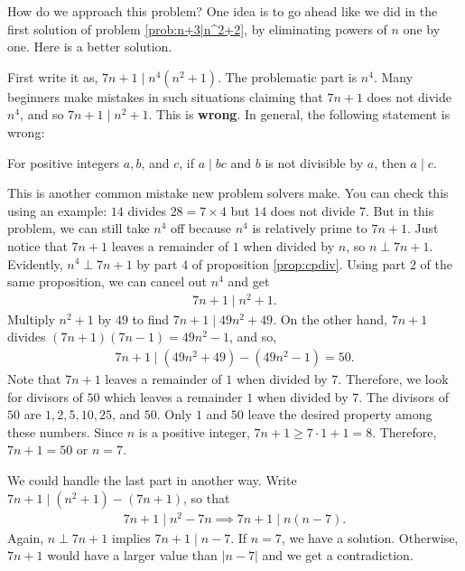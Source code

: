 \documentclass{subfile}
\begin{document}
		\begin{solution}
			How do we approach this problem? One idea is to go ahead like we did in the first solution of problem \eqref{prob:n+3|n^2+2}, by eliminating powers of $n$ one by one. Here is a better solution.

			First write it as, $7n+1 \mid n^4(n^2+1)$. The problematic part is $n^4$. Many beginners make mistakes in such situations claiming that $7n+1$ does not divide $n^4$, and so $7n+1 \mid n^2+1$. This is \textbf{wrong}. In general, the following statement is wrong:
			\begin{displayquote}
				For positive integers $a,b$, and $c$, if $a\mid bc$ and $b$ is not divisible by $a$, then $a\mid c$.
			\end{displayquote}
			This is another common  mistake new problem solvers make. You can check this using an example: $14$ divides $28=7\times4$ but $14$ does not divide $7$. But in this problem, we can still take $n^4$ off because $n^4$ is relatively prime to $7n+1$. Just notice that $7n+1$ leaves a remainder of $1$ when divided by $n$, so $n\perp7n+1$. Evidently, $n^4\perp7n+1$ by part $4$ of proposition \eqref{prop:cpdiv}. Using part $2$ of the same proposition, we can cancel out $n^4$ and get
				\begin{align*}
					7n+1  \mid n^2+1.
				\end{align*}
			Multiply $n^2+1$ by $49$ to find $ 7n+1 \mid 49n^2+49$. On the other hand, $7n+1$ divides $(7n+1)(7n-1)=49n^2-1$, and so,
				\begin{align*}
					7n+1 \mid (49n^2+49)-(49n^2-1) = 50.
				\end{align*}
			Note that $7n+1$ leaves a remainder of $1$ when divided by $7$. Therefore, we look for divisors of $50$ which leaves a remainder $1$ when divided by $7$. The divisors of $50$ are $1,2,5,10,25$, and $50$. Only $1$ and $50$ leave the desired property among these numbers. Since $n$ is a positive integer, $7n+1\geq7\cdot1+1=8$. Therefore, $7n+1=50$ or $n=7$.
		\end{solution}

		\begin{remark}
			We could handle the last part in another way. Write $7n+1\mid (n^2+1)-(7n+1)$, so that
				\begin{align*}
					7n+1  \mid n^2-7n \implies 7n+1\mid  n(n-7).
				\end{align*}
			Again, $n\perp7n+1$ implies $7n+1\mid n-7$. If $n=7$, we have a solution. Otherwise, $7n+1$ would have a larger value than $|n-7|$ and we get a contradiction.
		\end{remark}
\end{document}

